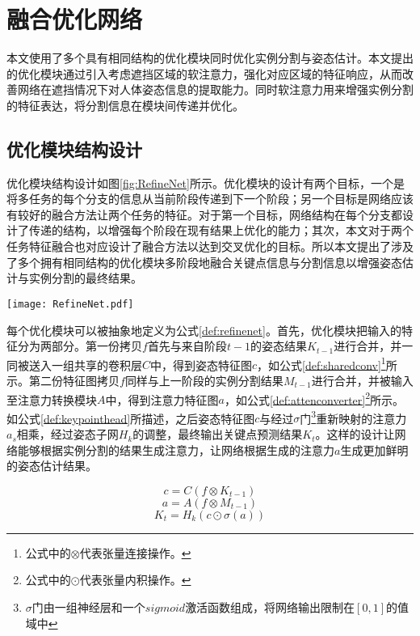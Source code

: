 \section{融合优化网络}
\label{sec:refine}
本文使用了多个具有相同结构的优化模块同时优化实例分割与姿态估计。本文提出的优化模块通过引入考虑遮挡区域的软注意力，强化对应区域的特征响应，从而改善网络在遮挡情况下对人体姿态信息的提取能力。同时软注意力用来增强实例分割的特征表达，将分割信息在模块间传递并优化。

\subsection{优化模块结构设计}
\label{subsec:architecture}

优化模块结构设计如图\ref{fig:RefineNet}所示。优化模块的设计有两个目标，一个是将多任务的每个分支的信息从当前阶段传递到下一个阶段；另一个目标是网络应该有较好的融合方法让两个任务的特征。对于第一个目标，网络结构在每个分支都设计了传递的结构，以增强每个阶段在现有结果上优化的能力；其次，本文对于两个任务特征融合也对应设计了融合方法以达到交叉优化的目标。所以本文提出了涉及了多个拥有相同结构的优化模块多阶段地融合关键点信息与分割信息以增强姿态估计与实例分割的最终结果。

\begin{figure*}[h]	
	\centering
	\texttt{[image: RefineNet.pdf]}
	\caption{融合优化网络具体设计}
	\label{fig:RefineNet}
\end{figure*}

每个优化模块可以被抽象地定义为公式\eqref{def:refinenet}。首先，优化模块把输入的特征分为两部分。第一份拷贝$f$首先与来自阶段$t-1$的姿态结果$K_{t-1}$进行合并，并一同被送入一组共享的卷积层$C$中，得到姿态特征图$c$，如公式\eqref{def:sharedconv}\footnote{公式中的$\otimes$代表张量连接操作。}所示。第二份特征图拷贝$f$同样与上一阶段的实例分割结果$M_{t-1}$进行合并，并被输入至注意力转换模块$A$中，得到注意力特征图$a$，如公式\eqref{def:attenconverter}\footnote{公式中的$\odot$代表张量内积操作。}所示。如公式\eqref{def:keypointhead}所描述，之后姿态特征图$c$与经过$\sigma$门\footnote{$\sigma$门由一组神经层和一个$sigmoid$激活函数组成，将网络输出限制在$[0,1]$的值域中}重新映射的注意力$a_s$相乘，经过姿态子网$H_k$的调整，最终输出关键点预测结果$K_t$。这样的设计让网络能够根据实例分割的结果生成注意力，让网络根据生成的注意力$a$生成更加鲜明的姿态估计结果。

\begin{equation}
\label{def:sharedconv}
c = C(f\otimes{K_{t-1}})
\end{equation}
\begin{equation}
\label{def:attenconverter}
a = A(f\otimes{M_{t-1}})
\end{equation}
\begin{equation}
\label{def:keypointhead}
K_t = H_k(c\odot \sigma(a))
\end{equation}

